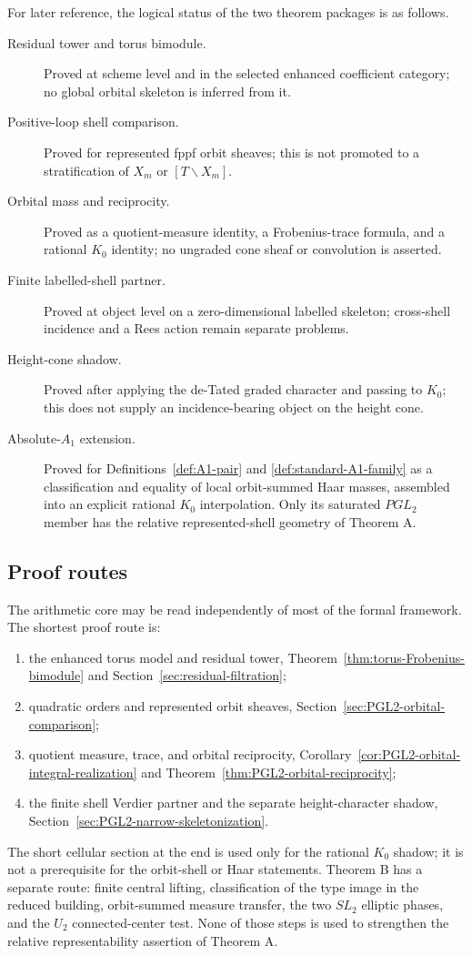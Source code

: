 \documentclass[11pt]{article}
\theoremstyle{definition}
\theoremstyle{remark}
\begin{document}
For later reference, the logical status of the two theorem packages is as
follows.
\begin{description}
\item[Residual tower and torus bimodule.]
Proved at scheme level and in the selected enhanced coefficient category; no
global orbital skeleton is inferred from it.
\item[Positive-loop shell comparison.]
Proved for represented fppf orbit sheaves; this is not promoted to a
stratification of $X_m$ or $[T\backslash X_m]$.
\item[Orbital mass and reciprocity.]
Proved as a quotient-measure identity, a Frobenius-trace formula, and a
rational $K_0$ identity; no ungraded cone sheaf or convolution is asserted.
\item[Finite labelled-shell partner.]
Proved at object level on a zero-dimensional labelled skeleton; cross-shell
incidence and a Rees action remain separate problems.
\item[Height-cone shadow.]
Proved after applying the de-Tated graded character and passing to $K_0$; this
does not supply an incidence-bearing object on the height cone.
\item[Absolute-$A_1$ extension.]
Proved for Definitions~\ref{def:A1-pair} and
\ref{def:standard-A1-family} as a classification and equality of local
orbit-summed Haar masses, assembled into an explicit rational $K_0$
interpolation.  Only its saturated $PGL_2$ member has the relative
represented-shell geometry of Theorem A.
\end{description}

\subsection{Proof routes}

The arithmetic core may be read independently of most of the formal
framework.  The shortest proof route is:
\begin{enumerate}
\item the enhanced torus model and residual tower,
  Theorem~\ref{thm:torus-Frobenius-bimodule} and
  Section~\ref{sec:residual-filtration};
\item quadratic orders and represented orbit sheaves,
  Section~\ref{sec:PGL2-orbital-comparison};
\item quotient measure, trace, and orbital reciprocity,
  Corollary~\ref{cor:PGL2-orbital-integral-realization} and
  Theorem~\ref{thm:PGL2-orbital-reciprocity};
\item the finite shell Verdier partner and the separate height-character
  shadow, Section~\ref{sec:PGL2-narrow-skeletonization}.
\end{enumerate}
The short cellular section at the end is used only for the rational $K_0$
shadow; it is not a prerequisite for the orbit-shell or Haar statements.
Theorem B has a separate route: finite central lifting, classification of the
type image in the reduced building, orbit-summed measure transfer, the two
$SL_2$ elliptic phases, and the $U_2$ connected-center test.  None of those
steps is used to strengthen the relative representability assertion of
Theorem A.
\end{document}
